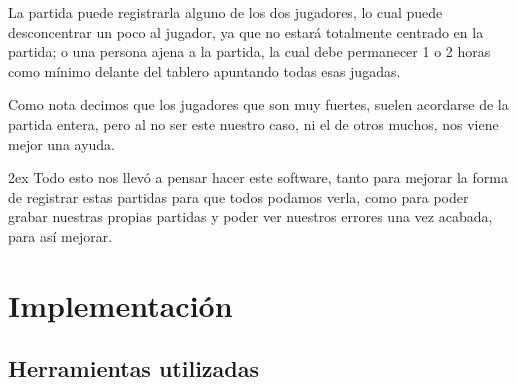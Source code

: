 \documentclass[12pt,a4paper]{report}
\begin{document}
La partida puede registrarla alguno de los dos jugadores, lo cual puede
desconcentrar un poco al jugador, ya que no estará totalmente centrado en la
partida; o una persona ajena a la partida, la cual debe permanecer 1 o 2 horas
como mínimo delante del tablero apuntando todas esas jugadas. 

Como nota decimos que los jugadores que son muy fuertes, suelen acordarse de la
partida entera, pero al no ser este nuestro caso, ni el de otros muchos, nos
viene mejor una ayuda. 

\parskip 2ex
Todo esto nos llevó a pensar hacer este software, tanto para mejorar la forma de
registrar estas partidas para que todos podamos verla, como para poder grabar
nuestras propias partidas y poder ver nuestros errores una vez acabada, para así
mejorar. 


\chapter{Implementación}

\section{Herramientas utilizadas}
\end{document}
